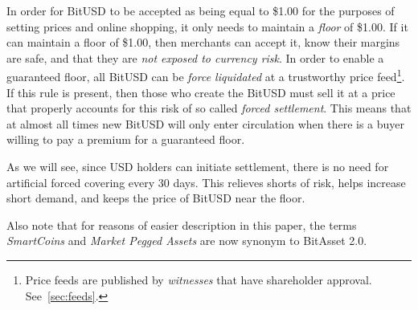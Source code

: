In order for BitUSD to be accepted as being equal to \$1.00 for the purposes of
setting prices and online shopping, it only needs to maintain a \emph{floor} of
\$1.00. If it can maintain a floor of \$1.00, then merchants can accept it,
know their margins are safe, and that they are \emph{not exposed to currency
risk}. In order to enable a guaranteed floor, all BitUSD can be \emph{force
liquidated} at a trustworthy price feed\footnote{Price feeds are published by
\emph{witnesses} that have shareholder approval. See~\cref{sec:feeds}.}. If
this rule is present, then those who create the BitUSD must sell it at a price
that properly accounts for this risk of so called \emph{forced settlement}.
This means that at almost all times new BitUSD will only enter circulation when
there is a buyer willing to pay a premium for a guaranteed floor.

As we will see, since USD holders can initiate settlement, there is no need for
artificial forced covering every 30 days. This relieves shorts of risk, helps
increase short demand, and keeps the price of BitUSD near the floor.

Also note that for reasons of easier description in this paper, the terms
\emph{SmartCoins} and \emph{Market Pegged Assets} are now synonym to BitAsset
2.0.
